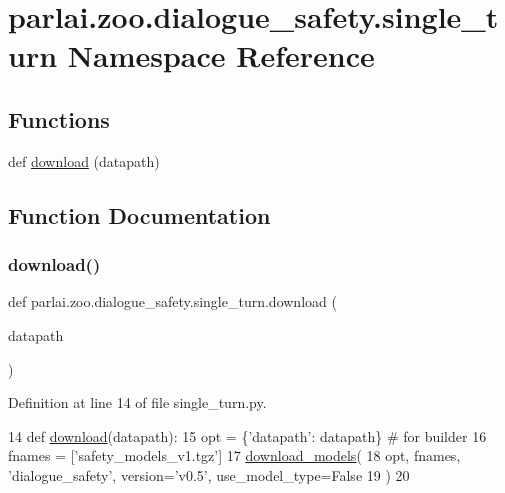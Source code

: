\hypertarget{namespaceparlai_1_1zoo_1_1dialogue__safety_1_1single__turn}{}\section{parlai.\+zoo.\+dialogue\+\_\+safety.\+single\+\_\+turn Namespace Reference}
\label{namespaceparlai_1_1zoo_1_1dialogue__safety_1_1single__turn}
\subsection*{Functions}
\begin{DoxyCompactItemize}
\item 
def \hyperlink{namespaceparlai_1_1zoo_1_1dialogue__safety_1_1single__turn_a16b618bff8b38c10b5ffc4b822b227dc}{download} (datapath)
\end{DoxyCompactItemize}


\subsection{Function Documentation}
\mbox{\label{namespaceparlai_1_1zoo_1_1dialogue__safety_1_1single__turn_a16b618bff8b38c10b5ffc4b822b227dc}} 
\subsubsection{\texorpdfstring{download()}{download()}}
{\footnotesize\ttfamily def parlai.\+zoo.\+dialogue\+\_\+safety.\+single\+\_\+turn.\+download (\begin{DoxyParamCaption}\item[{}]{datapath }\end{DoxyParamCaption})}



Definition at line 14 of file single\+\_\+turn.\+py.


\begin{DoxyCode}
14 \textcolor{keyword}{def }\hyperlink{namespaceparlai_1_1zoo_1_1dialogue__safety_1_1single__turn_a16b618bff8b38c10b5ffc4b822b227dc}{download}(datapath):
15     opt = \{\textcolor{stringliteral}{'datapath'}: datapath\}  \textcolor{comment}{# for builder}
16     fnames = [\textcolor{stringliteral}{'safety\_models\_v1.tgz'}]
17     \hyperlink{namespaceparlai_1_1core_1_1build__data_ab697f23f05d3e36d7979fe5e0ed7911e}{download\_models}(
18         opt, fnames, \textcolor{stringliteral}{'dialogue\_safety'}, version=\textcolor{stringliteral}{'v0.5'}, use\_model\_type=\textcolor{keyword}{False}
19     )
20 \end{DoxyCode}

